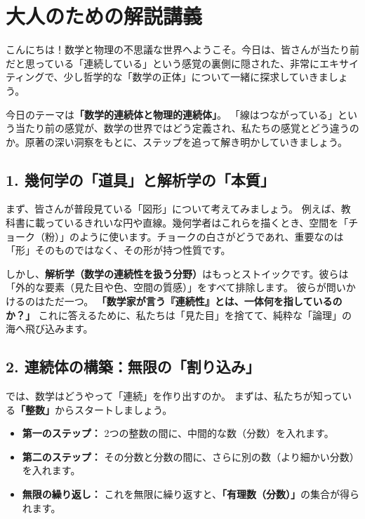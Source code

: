 \documentclass[a4paper,11pt,openany]{ltjsbook}
\begin{document}
\section{大人のための解説講義}
\begin{lecturebox}
こんにちは！数学と物理の不思議な世界へようこそ。今日は、皆さんが当たり前だと思っている「連続している」という感覚の裏側に隠された、非常にエキサイティングで、少し哲学的な「数学の正体」について一緒に探求していきましょう。

今日のテーマは\textbf{「数学的連続体と物理的連続体」}。
「線はつながっている」という当たり前の感覚が、数学の世界ではどう定義され、私たちの感覚とどう違うのか。原著の深い洞察をもとに、ステップを追って解き明かしていきましょう。

\subsection*{1. 幾何学の「道具」と解析学の「本質」}

まず、皆さんが普段見ている「図形」について考えてみましょう。
例えば、教科書に載っているきれいな円や直線。幾何学者はこれらを描くとき、空間を「チョーク（粉）」のように使います。チョークの白さがどうであれ、重要なのは「形」そのものではなく、その形が持つ性質です。

しかし、\textbf{解析学（数学の連続性を扱う分野）}はもっとストイックです。彼らは「外的な要素（見た目や色、空間の質感）」をすべて排除します。
彼らが問いかけるのはただ一つ。
\textbf{「数学家が言う『連続性』とは、一体何を指しているのか？」}
これに答えるために、私たちは「見た目」を捨てて、純粋な「論理」の海へ飛び込みます。

\subsection*{2. 連続体の構築：無限の「割り込み」}

では、数学はどうやって「連続」を作り出すのか。
まずは、私たちが知っている\textbf{「整数」}からスタートしましょう。

\begin{itemize}[leftmargin=2em]
\item \textbf{第一のステップ：} 2つの整数の間に、中間的な数（分数）を入れます。
\item \textbf{第二のステップ：} その分数と分数の間に、さらに別の数（より細かい分数）を入れます。
\item \textbf{無限の繰り返し：} これを無限に繰り返すと、\textbf{「有理数（分数）」}の集合が得られます。
\end{itemize}


\end{lecturebox}
\end{document}
